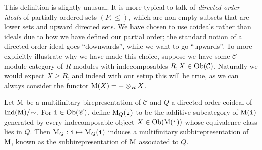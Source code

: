 \noindent\begin{remark} This definition is slightly unusual. It is more typical to talk of {\em directed order ideals} of partially ordered sets $(P, \leq)$, which are non-empty subsets that are lower sets and upward directed sets. We have chosen to use coideals rather than ideals due to how we have defined our partial order; the standard notion of a directed order ideal goes ``downwards'', while we want to go ``upwards''. To more explicitly illustrate why we have made this choice, suppose we have some $\mathcal{C}$-module category of $R$-modules with indecomposables $R, X \in \textnormal{Ob}(\mathcal{C})$. Naturally we would expect $X \geq R$, and indeed with our setup this will be true, as we can always consider the functor $\textup{M}(X) = - \otimes_R X$.\\
\end{remark}


\noindent Let $\textup{M}$ be a multifinitary birepresentation of $\mathscr{C}$ and $Q$ a directed order coideal of $\textup{Ind}(\textup{M})/\!\sim$. For $\textnormal{\texttt{i}} \in \textnormal{Ob}(\mathscr{C})$, define $\textup{M}_Q(\textnormal{\texttt{i}})$ to be the additive subcategory of $\textup{M}(\textnormal{\texttt{i}})$ generated by every indecomposable object $X \in \textnormal{Ob}(\textup{M}(\textnormal{\texttt{i}}))$ whose equivalence class lies in $Q$. Then $\textup{M}_Q : \textnormal{\texttt{i}} \mapsto \textup{M}_Q(\textnormal{\texttt{i}})$ induces a multifinitary subbirepresentation of $\textup{M}$, known as the subbirepresentation of $\textup{M}$ associated to $Q$.\\

